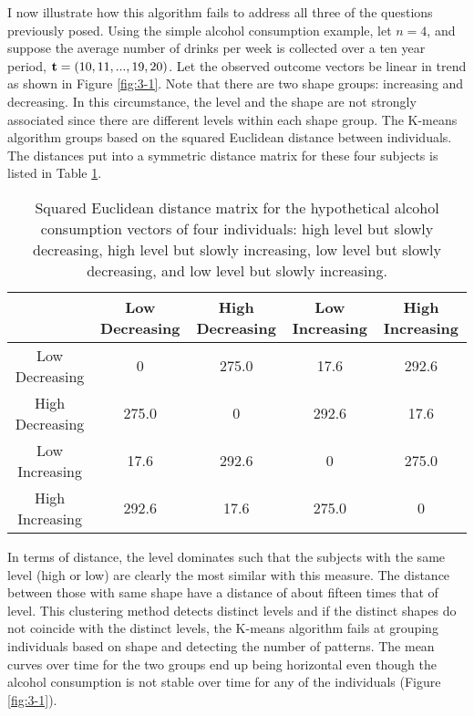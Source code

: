 I now illustrate how this algorithm fails to address all three of the questions previously posed. Using the simple alcohol consumption example, let $n=4$, and suppose the average number of drinks per week is collected over a ten year period, $\mathbf t=(10,11,...,19,20)$. Let the observed outcome vectors be linear in trend as shown in Figure \ref{fig:3-1}. Note that there are two shape groups: increasing and decreasing. In this circumstance, the level and the shape are not strongly associated since there are different levels within each shape group. The K-means algorithm groups based on the squared Euclidean distance between individuals. The distances put into a symmetric distance matrix for these four subjects is listed in Table \ref{tab:3-1}. 
\begin{table}[h]
\begin{center}
\begin{tabular}{c|cccc}
&Low Decreasing& High Decreasing&Low Increasing&High Increasing\\
\hline
Low Decreasing&0&275.0&17.6&292.6\\
High Decreasing&275.0  &0 &  292.6 &17.6 \\                     
Low Increasing& 17.6 &292.6  &0   &275.0   \\          
High Increasing& 292.6 &17.6 &275.0   &0 
\end{tabular}
\end{center}
\caption{Squared Euclidean distance matrix for the hypothetical alcohol consumption vectors of four individuals: high level but slowly decreasing, high level but slowly increasing, low level but slowly decreasing, and low level but slowly increasing. }
\label{tab:3-1}
\end{table}

In terms of distance, the level dominates such that the subjects with the same level (high or low) are clearly the most similar with this measure. The distance between those with same shape have a distance of about fifteen times that of level. This clustering method detects distinct levels and if the distinct shapes do not coincide with the distinct levels, the K-means algorithm fails at grouping individuals based on shape and detecting the number of patterns. The mean curves over time for the two groups end up being horizontal even though the alcohol consumption is not stable over time for any of the individuals (Figure \ref{fig:3-1}).

